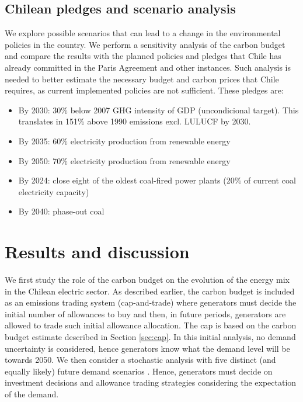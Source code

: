 \documentclass[11pt, letterpaper]{article}
\begin{document}
\subsection{Chilean pledges and scenario analysis}
\label{sec:basecase}
We explore possible scenarios that can lead to a change in the environmental policies in the country. We perform a sensitivity analysis of the carbon budget and compare the results with the planned policies and pledges that Chile has already committed in the Paris Agreement and other instances. Such analysis is needed to better estimate the necessary budget and carbon prices that Chile requires, as current implemented policies are not sufficient. These pledges are:

\begin{itemize}
    \item By 2030: 30\% below 2007 GHG intensity of GDP (uncondicional target). This translates in 151\% above 1990 emissions excl. LULUCF by 2030. 
    \item By 2035: 60\% electricity production from renewable energy 
    \item By 2050: 70\% electricity production from renewable energy
    \item By 2024: close eight of the oldest coal-fired power plants (20\% of current coal electricity capacity) 
    \item By 2040: phase-out coal 
\end{itemize}

\bigskip


\section{Results and discussion}\label{results}
We first study the role of the carbon budget on the evolution of the energy mix in the Chilean electric sector. As described earlier, the carbon budget is included as an emissions trading system (cap-and-trade) where generators must decide the initial number of allowances to buy and then, in future periods, generators are allowed to trade such initial allowance allocation. The cap is based on the carbon budget estimate described in Section \ref{sec:cap}. In this initial analysis, no demand uncertainty is considered, hence generators know what the demand level will be towards 2050. We then consider a stochastic analysis with five distinct (and equally likely) future demand scenarios \cite{HojadeRuta}. Hence, generators must decide on investment decisions and allowance trading strategies considering the expectation of the demand. 
\end{document}
